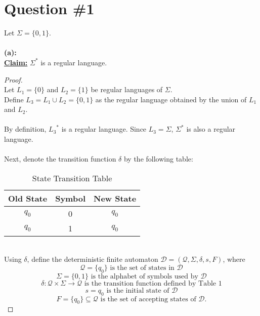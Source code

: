 \documentclass[12pt]{article}
\begin{document}
\renewcommand{\familydefault}{\rmdefault}



\pagebreak
\normalsize

\section*{Question \#1}
Let $\Sigma = \{ 0, 1 \} $. \\
\\
\textbf{(a):} \\
\textbf{\underline{Claim:}} $\Sigma^*$ is a regular language.
\begin{proof}
\leavevmode\\
    Let $L_1 = \{0\}$ and $L_2 = \{1\}$ be regular languages of $\Sigma$. \\
    Define $L_3 = L_1 \cup L_2 = \{ 0, 1 \}$ as the regular language obtained by the union of $L_1$ and $L_2$. \\
    \\
    By definition, ${L_3}^*$ is a regular language. Since ${L_3} = \Sigma$, $\Sigma^*$ is also a regular language. \\
    \\
    Next, denote the transition function $\delta$ by the following table:
    \begin{table}[h!]
        \centering
        \begin{tabular}{|c|c|c|}
            \hline
            \textbf{Old State} & \textbf{Symbol} & \textbf{New State} \\
            \hline
            \( q_0 \) & 0 & \( q_0 \) \\
            \( q_0 \) & 1 & \( q_0 \) \\
            \hline
        \end{tabular}
        \caption{State Transition Table}
    \end{table}
    \\
    Using $\delta$, define the deterministic finite automaton $\mathcal{D} = (\mathcal{Q}, \Sigma, \delta, s, F)$, where
    \[
        \mathcal{Q} = \{ q_0 \} \text{ is the set of states in } \mathcal{D}
    \]
    \[
        \Sigma = \{ 0, 1 \} \text{ is the alphabet of symbols used by } \mathcal{D} 
    \]
    \[
        \delta : \mathcal{Q} \times \Sigma \to \mathcal{Q} \text{ is the transition function defined by Table 1}
    \]
    \[
        s = q_0 \text{ is the initial state of } \mathcal{D}
    \]
    \[
        F = \{ q_0 \} \subseteq \mathcal{Q} \text{ is the set of accepting states of } \mathcal{D} \text{.}
    \]
\end{proof}
\end{document}
